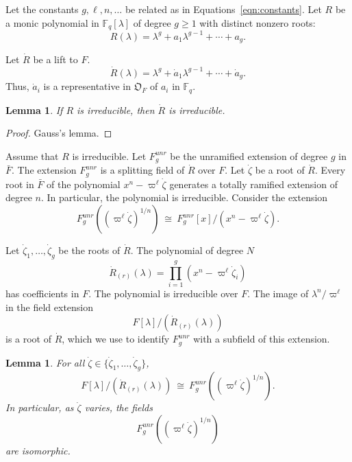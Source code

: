 \documentclass[11pt]{amsart}
\newtheorem{lemma}[theorem]{Lemma}
\theoremstyle{definition}
\theoremstyle{remark}
\numberwithin{equation}{theorem}
\def\F{{F}}
\def\A{{\mathfrak{O}_\F}}
\def\f{{\mathbb{F}_q}}
\def\iso{{\ \cong\ }}
\def\Fq{{\mathbb F}_q}
\begin{document}
Let the constants $g,\ell,n,\ldots$ be related as in
Equations~\ref{eqn:constants}.   Let $R$ be a monic polynomial in
$\Fq[\lambda]$ of degree $g\ge 1$ with distinct nonzero roots:
    \begin{equation}R(\lambda) = \lambda^g + a_1 \lambda^{g-1} +\cdots+
a_g.\end{equation}

Let $\dot R$ be a lift to $F$.
    \begin{equation}\dot R(\lambda) = \lambda^g + \dot a_1\lambda^{g-1}
    +\cdots+ \dot a_g.\end{equation}
Thus, $\dot a_i$ is a representative in $\A$ of $a_i$ in $\f$.

\begin{lemma} If $R$ is irreducible, then $\dot R$ is irreducible.
\end{lemma}

\begin{proof} Gauss's lemma.
\end{proof}

Assume that $R$ is irreducible.  Let $F^{unr}_g$ be the unramified
extension of degree $g$ in $\bar F$.  The extension $F^{unr}_g$ is
a splitting field of $\dot R$ over $F$. Let $\dot\zeta$ be a root
of $\dot R$. Every root in $\bar F$ of the polynomial $x^n -
\varpi^{\ell}\dot\zeta$ generates a totally ramified extension of
degree $n$.  In particular, the polynomial is irreducible.
Consider the extension
    \begin{equation}F^{unr}_g((\varpi^\ell\dot\zeta)^{1/n})\iso
      F^{unr}_g[x]/(x^n-\varpi^\ell \dot \zeta).\end{equation}

Let $\dot \zeta_1,\ldots,\dot\zeta_g$ be the roots of $\dot R$.
The polynomial of degree $N$
    \begin{equation}\dot R_{(r)}(\lambda) = \prod_{i=1}^g (x^n -
\varpi^{\ell}\dot\zeta_i)
    \end{equation}
has coefficients in $F$.  The polynomial is irreducible over $F$.
The image of $\lambda^n/\varpi^\ell$ in the field extension
   \begin{equation}F[\lambda]/(\dot R_{(r)}(\lambda))\end{equation}
is a root of $\dot R$, which we use to identify $F^{unr}_g$ with a
subfield of this extension.

\begin{lemma}
\label{lemma:fieldiso}  For all
$\dot\zeta\in\{\dot\zeta_1,\ldots,\dot\zeta_g\}$,
   \begin{equation}
   F[\lambda]/(\dot R_{(r)}(\lambda)) \iso
   F^{unr}_g((\varpi^\ell\dot\zeta)^{1/n}).
   \end{equation}
In particular, as $\dot\zeta$ varies, the fields
\begin{equation}F^{unr}_g((\varpi^\ell\dot\zeta)^{1/n})\end{equation}
are isomorphic.
\end{lemma}
\end{document}
